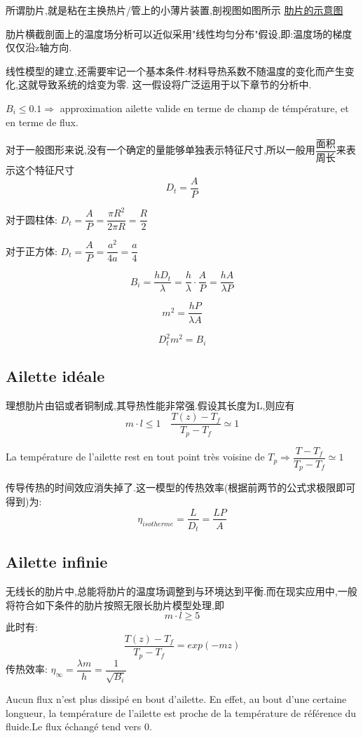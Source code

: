 \documentclass{article}
\begin{document}
所谓肋片,就是粘在主换热片/管上的小薄片装置,剖视图如图所示
\href{http://i.imgbox.com/UBJtc7TX.png}{肋片的示意图}

肋片横截剖面上的温度场分析可以近似采用"线性均匀分布"假设,即:温度场的梯度仅仅沿z轴方向.

线性模型的建立,还需要牢记一个基本条件:材料导热系数不随温度的变化而产生变化,这就导致系统的焓变为零.
这一假设将广泛运用于以下章节的分析中.

$B_i \leq 0.1 \Rightarrow$ approximation ailette valide en terme de champ de t\'emp\'erature, et en terme de flux.

对于一般图形来说,没有一个确定的量能够单独表示特征尺寸,所以一般用$\dfrac{\text{面积}}{\text{周长}}$来表示这个特征尺寸\\

$$D_t = \frac{A}{P}$$

对于圆柱体: $D_t = \dfrac{A}{P} = \dfrac{\pi R^2}{2 \pi R} = \dfrac{R}{2}$

对于正方体: $D_t = \dfrac{A}{P} = \dfrac{a^2}{4a} = \dfrac{a}{4}$

$$ B_i = \frac{h D_t}{\lambda} = \frac{h}{\lambda} \cdot \frac{A}{P} = \frac{hA}{\lambda P}$$

$$ m^2 = \frac{hP}{\lambda A}$$

$$ D_t^2 m^2 = B_i$$

\subsection{Ailette id\'eale}
理想肋片由铝或者铜制成,其导热性能非常强.假设其长度为L,则应有
$$ m\cdot l \leq 1 \quad \frac{T(z)-T_f}{T_p - T_f} \simeq 1 $$

La temp\'erature de l'ailette rest en tout point tr\`es voisine de $T_p  \Rightarrow \dfrac{ T - T_f}{T_p - T_f}\simeq 1$

传导传热的时间效应消失掉了.这一模型的传热效率(根据前两节的公式求极限即可得到)为:
$$
\eta_{isotherme} = \dfrac{L}{D_t} = \dfrac{LP}{A}
$$

\subsection{Ailette infinie}
无线长的肋片中,总能将肋片的温度场调整到与环境达到平衡.而在现实应用中,一般将符合如下条件的肋片按照无限长肋片模型处理,即
$$ m\cdot l \geq 5 $$
此时有:
$$ \frac{T(z)-T_f}{T_p - T_f}=exp(-mz) $$
传热效率: $\eta_{\infty} = \dfrac{\lambda m}{h} = \dfrac{1}{\sqrt{B_i}}$

Aucun flux n'est plus dissip\'e en bout d'ailette. En effet, au bout d'une certaine longueur, la temp\'erature de l'ailette est proche de la temp\'erature de r\'ef\'erence du fluide.Le flux \'echang\'e tend vers $0$.
\end{document}
